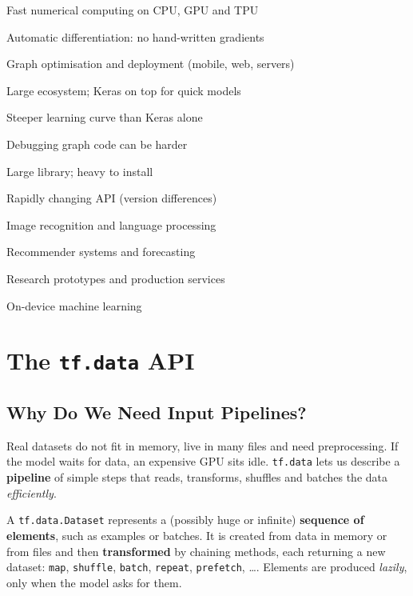 {\item Fast numerical computing on CPU, GPU and TPU
 \item Automatic differentiation: no hand-written gradients
 \item Graph optimisation and deployment (mobile, web, servers)
 \item Large ecosystem; Keras on top for quick models}
{\item Steeper learning curve than Keras alone
 \item Debugging graph code can be harder
 \item Large library; heavy to install
 \item Rapidly changing API (version differences)}
{\item Image recognition and language processing
 \item Recommender systems and forecasting
 \item Research prototypes and production services
 \item On-device machine learning}

\section{The \texttt{tf.data} API}

\subsection{Why Do We Need Input Pipelines?}

Real datasets do not fit in memory, live in many files and need preprocessing. If the model waits for data, an expensive GPU sits idle. \texttt{tf.data} lets us describe a \textbf{pipeline} of simple steps that reads, transforms, shuffles and batches the data \emph{efficiently}.

\begin{definition}
A \texttt{tf.data.Dataset} represents a (possibly huge or infinite) \textbf{sequence of elements}, such as examples or batches. It is created from data in memory or from files and then \textbf{transformed} by chaining methods, each returning a new dataset: \texttt{map}, \texttt{shuffle}, \texttt{batch}, \texttt{repeat}, \texttt{prefetch}, \dots. Elements are produced \emph{lazily}, only when the model asks for them.
\end{definition}

